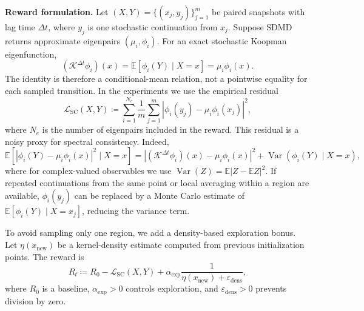 \documentclass{article}
\numberwithin{equation}{section}
\theoremstyle{definition}
\newcommand{\new}{\text{new}}
\begin{document}
\textbf{Reward formulation.}
Let $(X,Y)=\{(x_j,y_j)\}_{j=1}^{m}$ be paired snapshots with lag time $\Delta t$, where $y_j$ is one stochastic continuation from $x_j$. Suppose SDMD returns approximate eigenpairs $(\mu_i,\phi_i)$. For an exact stochastic Koopman eigenfunction,
\begin{equation*}
    (\mathcal K^{\Delta t}\phi_i)(x)
    =\mathbb{E}[\phi_i(Y)\mid X=x]
    =\mu_i\phi_i(x).
\end{equation*}
The identity is therefore a conditional-mean relation, not a pointwise equality for each sampled transition. In the experiments we use the empirical residual
\begin{equation*}
    \mathcal{L}_{\mathrm{SC}}(X,Y)
    \coloneqq
    \sum_{i=1}^{N_e}\frac{1}{m}\sum_{j=1}^{m}
    \left|\phi_i(y_j)-\mu_i\phi_i(x_j)\right|^2,
\end{equation*}
where $N_e$ is the number of eigenpairs included in the reward. This residual is a noisy proxy for spectral consistency. Indeed,
\begin{equation*}
\mathbb{E}\!\left[\left|\phi_i(Y)-\mu_i\phi_i(x)\right|^2\mid X=x\right]
=\left|(\mathcal K^{\Delta t}\phi_i)(x)-\mu_i\phi_i(x)\right|^2
+\operatorname{Var}\!\left(\phi_i(Y)\mid X=x\right),
\end{equation*}
where for complex-valued observables we use $\operatorname{Var}(Z)=\mathbb{E}|Z-\mathbb{E}Z|^2$. If repeated continuations from the same point or local averaging within a region are available, $\phi_i(y_j)$ can be replaced by a Monte Carlo estimate of $\mathbb{E}[\phi_i(Y)\mid X=x_j]$, reducing the variance term.

To avoid sampling only one region, we add a density-based exploration bonus. Let $\eta(x_{\new})$ be a kernel-density estimate computed from previous initialization points. The reward is
\begin{equation}\label{eq:reward}
    R_t
    \coloneqq
    R_0-\mathcal{L}_{\mathrm{SC}}(X,Y)
    +\alpha_{\mathrm{exp}}\frac{1}{\eta(x_{\new})+\varepsilon_{\mathrm{dens}}},
\end{equation}
where $R_0$ is a baseline, $\alpha_{\mathrm{exp}}>0$ controls exploration, and $\varepsilon_{\mathrm{dens}}>0$ prevents division by zero.
\end{document}
